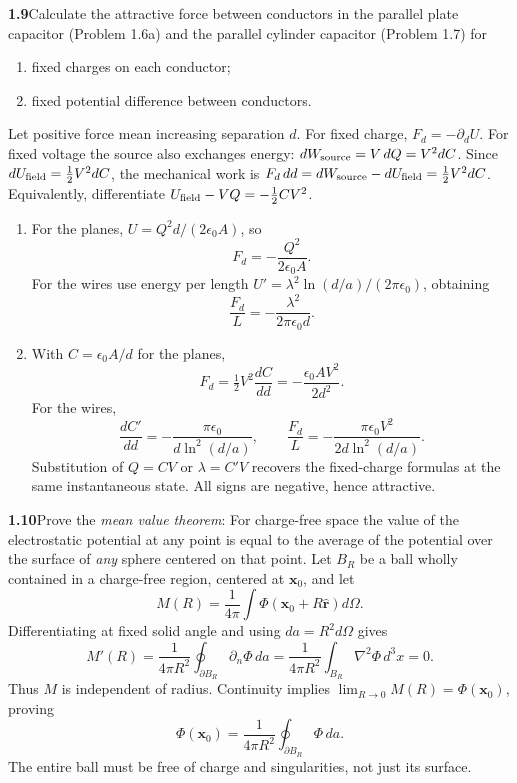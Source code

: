 \par\bigskip
\noindent\textbf{1.9}\quad Calculate the attractive force between conductors in the parallel plate capacitor (Problem 1.6a) and the parallel cylinder capacitor (Problem 1.7) for
\begin{enumerate}
\item[(a)] fixed charges on each conductor;
\item[(b)] fixed potential difference between conductors.
\end{enumerate}
\solution
Let positive force mean increasing separation $d$. For fixed charge,
$F_d=-\partial_d U$. For fixed voltage the source also exchanges energy:
$dW_{\rm source}=V\,dQ=V^2dC$. Since
$dU_{\rm field}=\tfrac12V^2dC$, the mechanical work is
$F_d\,dd=dW_{\rm source}-dU_{\rm field}=\tfrac12V^2dC$.
Equivalently, differentiate $U_{\rm field}-VQ=-\tfrac12CV^2$.
\begin{enumerate}
\item[(a)] For the planes, $U=Q^2d/(2\epsilon_0A)$, so
\[
\boxed{F_d=-\frac{Q^2}{2\epsilon_0A}.}
\]
For the wires use energy per length
$U'=\lambda^2\ln(d/a)/(2\pi\epsilon_0)$, obtaining
\[
\boxed{\frac{F_d}{L}=-\frac{\lambda^2}{2\pi\epsilon_0d}.}
\]
\item[(b)] With $C=\epsilon_0A/d$ for the planes,
\[
\boxed{F_d=\tfrac12V^2\frac{dC}{dd}
=-\frac{\epsilon_0AV^2}{2d^2}.}
\]
For the wires,
\[
\frac{dC'}{dd}=-\frac{\pi\epsilon_0}{d\ln^2(d/a)},\qquad
\boxed{\frac{F_d}{L}=-\frac{\pi\epsilon_0V^2}{2d\ln^2(d/a)}.}
\]
Substitution of $Q=CV$ or $\lambda=C'V$ recovers the fixed-charge formulas
at the same instantaneous state. All signs are negative, hence attractive.
\end{enumerate}


\par\bigskip
\noindent\textbf{1.10}\quad Prove the \emph{mean value theorem}: For charge-free space the value of the electrostatic potential at any point is equal to the average of the potential over the surface of \emph{any} sphere centered on that point.
\solution
Let $B_R$ be a ball wholly contained in a charge-free region, centered at
$\mathbf x_0$, and let
\[
M(R)=\frac1{4\pi}\int\Phi(\mathbf x_0+R\widehat{\mathbf r})d\Omega.
\]
Differentiating at fixed solid angle and using $da=R^2d\Omega$ gives
\[
M'(R)=\frac1{4\pi R^2}\oint_{\partial B_R}\partial_n\Phi\,da
=\frac1{4\pi R^2}\int_{B_R}\nabla^2\Phi\,d^3x=0.
\]
Thus $M$ is independent of radius. Continuity implies
$\lim_{R\to0}M(R)=\Phi(\mathbf x_0)$, proving
\[
\boxed{\Phi(\mathbf x_0)=\frac1{4\pi R^2}\oint_{\partial B_R}\Phi\,da.}
\]
The entire ball must be free of charge and singularities, not just its surface.


